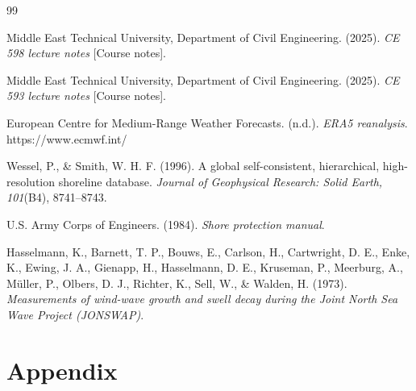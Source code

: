 \documentclass[a4paper, 11pt]{article}
\begin{document}

\begin{thebibliography}{99}

\bibitem{}
Middle East Technical University, Department of Civil Engineering. (2025). \textit{CE 598 lecture notes} [Course notes].

\bibitem{}
Middle East Technical University, Department of Civil Engineering. (2025). \textit{CE 593 lecture notes} [Course notes].

\bibitem{}
European Centre for Medium-Range Weather Forecasts. (n.d.). \textit{ERA5 reanalysis}. https://www.ecmwf.int/

\bibitem{}
Wessel, P., \& Smith, W. H. F. (1996). A global self-consistent, hierarchical, high-resolution shoreline database. \textit{Journal of Geophysical Research: Solid Earth, 101}(B4), 8741--8743.

\bibitem{}
U.S. Army Corps of Engineers. (1984). \textit{Shore protection manual}.

\bibitem{}
Hasselmann, K., Barnett, T. P., Bouws, E., Carlson, H., Cartwright, D. E., Enke, K., Ewing, J. A., Gienapp, H., Hasselmann, D. E., Kruseman, P., Meerburg, A., M\"uller, P., Olbers, D. J., Richter, K., Sell, W., \& Walden, H. (1973). \textit{Measurements of wind-wave growth and swell decay during the Joint North Sea Wave Project (JONSWAP)}.

\end{thebibliography}
\newpage

\appendix
\section{Appendix}
\end{document}
